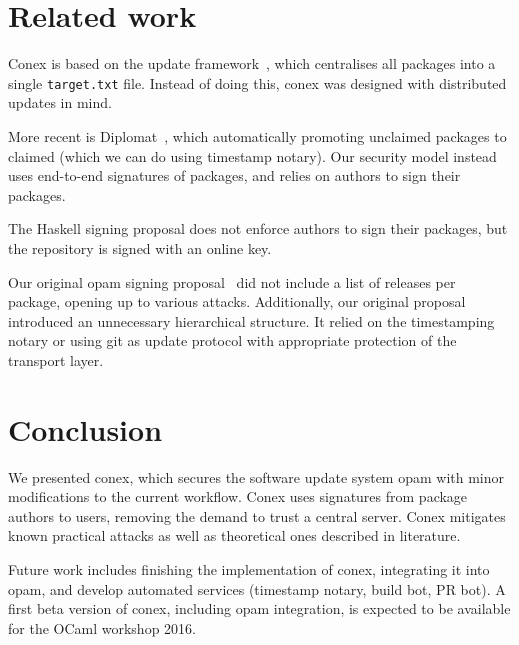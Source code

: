 \documentclass[nocopyrightspace]{sigplanconf}
\newcommand{\TODO}[1]{\textbf{[TODO: #1]}}
\begin{document}
\section{Related work} \label{sec:related}
Conex is based on the update framework~\cite{tuf}, which centralises all packages into a single \texttt{target.txt} file.
Instead of doing this, conex was designed with distributed updates in mind.

More recent is Diplomat~\cite{diplomat}, which automatically promoting unclaimed packages to claimed (which we can do using timestamp notary).
Our security model instead uses end-to-end signatures of packages, and relies on authors to sign their packages.

The Haskell signing proposal does not enforce authors to sign their packages, but the repository is signed with an online key.

Our original opam signing proposal~\cite{opamsigning} did not include a list of releases per package, opening up to various attacks.
Additionally, our original proposal introduced an unnecessary hierarchical structure.
It relied on the timestamping notary or using git as update protocol with appropriate protection of the transport layer.

\section{Conclusion} \label{sec:conclusion}
We presented conex, which secures the software update system opam with minor modifications to the current workflow.
Conex uses signatures from package authors to users, removing the demand to trust a central server.
Conex mitigates known practical attacks as well as theoretical ones described in literature.

Future work includes finishing the implementation of conex, integrating it into opam, and develop automated services (timestamp notary, build bot, PR bot).
A first beta version of conex, including opam integration, is expected to be available for the OCaml workshop 2016.




\end{document}
